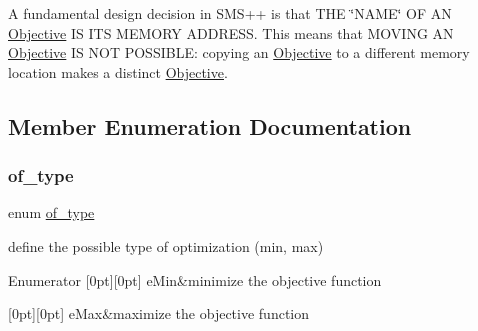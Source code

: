 A fundamental design decision in S\+M\+S++ is that T\+HE \char`\"{}\+N\+A\+M\+E\char`\"{} OF AN \mbox{\hyperlink{class_s_m_spp__di__unipi__it_1_1_objective}{Objective}} IS I\+TS M\+E\+M\+O\+RY A\+D\+D\+R\+E\+SS. This means that M\+O\+V\+I\+NG AN \mbox{\hyperlink{class_s_m_spp__di__unipi__it_1_1_objective}{Objective}} IS N\+OT P\+O\+S\+S\+I\+B\+LE\+: copying an \mbox{\hyperlink{class_s_m_spp__di__unipi__it_1_1_objective}{Objective}} to a different memory location makes a distinct \mbox{\hyperlink{class_s_m_spp__di__unipi__it_1_1_objective}{Objective}}. 

\subsection{Member Enumeration Documentation}
\mbox{\label{class_s_m_spp__di__unipi__it_1_1_objective_a3b041bc3197836c0472ce4db094fc7fa}} 
\subsubsection{\texorpdfstring{of\+\_\+type}{of\_type}}
{\footnotesize\ttfamily enum \mbox{\hyperlink{class_s_m_spp__di__unipi__it_1_1_objective_a3b041bc3197836c0472ce4db094fc7fa}{of\+\_\+type}}}



define the possible type of optimization (min, max) 

\begin{DoxyEnumFields}{Enumerator}
[0pt][0pt]{}\mbox{\label{class_s_m_spp__di__unipi__it_1_1_objective_a3b041bc3197836c0472ce4db094fc7faaea20cdf6f26b656e61b77542bc539cc7}} 
e\+Min&minimize the objective function \\
\hline

[0pt][0pt]{}\mbox{\label{class_s_m_spp__di__unipi__it_1_1_objective_a3b041bc3197836c0472ce4db094fc7faacd679e5be98d208e25fd34d613d4773c}} 
e\+Max&maximize the objective function \\
\hline

\end{DoxyEnumFields}


